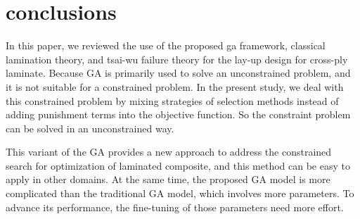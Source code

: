 \section{conclusions}
In this paper, we reviewed the use of the proposed ga framework, classical
lamination theory, and tsai-wu failure theory for the lay-up design for
cross-ply laminate. Because GA is primarily used to solve an unconstrained
problem, and it is not suitable for a constrained problem. In the present
study, we deal with this constrained problem by mixing strategies of selection
methods instead of adding punishment terms into the objective function. So the
constraint problem can be solved in an unconstrained way.

This variant of the GA provides a new approach to address the constrained
search for optimization of laminated composite, and this method can be easy
to apply in other domains. At the same time, the proposed GA model is more
complicated than the traditional GA model, which involves more parameters. To
advance its performance, the fine-tuning of those parameters need more effort. 
